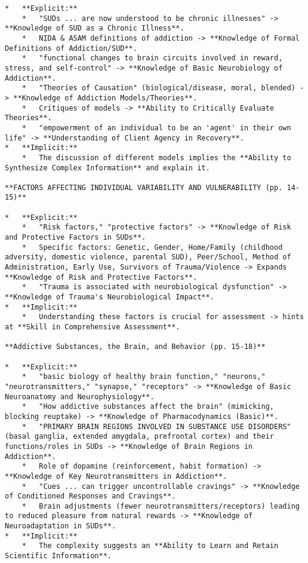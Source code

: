 \documentclass[
  letterpaper,
  DIV=11,
  numbers=noendperiod]{scrartcl}
\begin{document}
\begin{verbatim}
*   **Explicit:**
    *   "SUDs ... are now understood to be chronic illnesses" -> **Knowledge of SUD as a Chronic Illness**.
    *   NIDA & ASAM definitions of addiction -> **Knowledge of Formal Definitions of Addiction/SUD**.
    *   "functional changes to brain circuits involved in reward, stress, and self-control" -> **Knowledge of Basic Neurobiology of Addiction**.
    *   "Theories of Causation" (biological/disease, moral, blended) -> **Knowledge of Addiction Models/Theories**.
    *   Critiques of models -> **Ability to Critically Evaluate Theories**.
    *   "empowerment of an individual to be an 'agent' in their own life" -> **Understanding of Client Agency in Recovery**.
*   **Implicit:**
    *   The discussion of different models implies the **Ability to Synthesize Complex Information** and explain it.

**FACTORS AFFECTING INDIVIDUAL VARIABILITY AND VULNERABILITY (pp. 14-15)**

*   **Explicit:**
    *   "Risk factors," "protective factors" -> **Knowledge of Risk and Protective Factors in SUDs**.
    *   Specific factors: Genetic, Gender, Home/Family (childhood adversity, domestic violence, parental SUD), Peer/School, Method of Administration, Early Use, Survivors of Trauma/Violence -> Expands **Knowledge of Risk and Protective Factors**.
    *   "Trauma is associated with neurobiological dysfunction" -> **Knowledge of Trauma's Neurobiological Impact**.
*   **Implicit:**
    *   Understanding these factors is crucial for assessment -> hints at **Skill in Comprehensive Assessment**.

**Addictive Substances, the Brain, and Behavior (pp. 15-18)**

*   **Explicit:**
    *   "basic biology of healthy brain function," "neurons," "neurotransmitters," "synapse," "receptors" -> **Knowledge of Basic Neuroanatomy and Neurophysiology**.
    *   "How addictive substances affect the brain" (mimicking, blocking reuptake) -> **Knowledge of Pharmacodynamics (Basic)**.
    *   "PRIMARY BRAIN REGIONS INVOLVED IN SUBSTANCE USE DISORDERS" (basal ganglia, extended amygdala, prefrontal cortex) and their functions/roles in SUDs -> **Knowledge of Brain Regions in Addiction**.
    *   Role of dopamine (reinforcement, habit formation) -> **Knowledge of Key Neurotransmitters in Addiction**.
    *   "Cues ... can trigger uncontrollable cravings" -> **Knowledge of Conditioned Responses and Cravings**.
    *   Brain adjustments (fewer neurotransmitters/receptors) leading to reduced pleasure from natural rewards -> **Knowledge of Neuroadaptation in SUDs**.
*   **Implicit:**
    *   The complexity suggests an **Ability to Learn and Retain Scientific Information**.


\end{verbatim}
\end{document}
